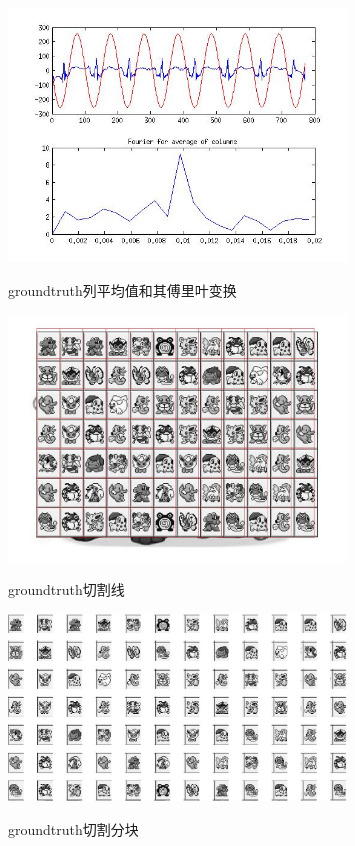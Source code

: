 \documentclass{ctexart}
\begin{document}
\begin{figure}
    \centering
    \includegraphics[width=0.8\textwidth]{process/a421b.jpg}\\
    \caption{groundtruth列平均值和其傅里叶变换\label{a421b}}
\end{figure}
\begin{figure}
    \centering
    \includegraphics[width=0.8\textwidth]{process/a421c.jpg}\\
    \caption{groundtruth切割线\label{a421c}}
\end{figure}
\begin{figure}
    \centering
    \includegraphics[width=0.8\textwidth]{process/a421d.jpg}\\
    \caption{groundtruth切割分块\label{a421d}}
\end{figure}
\end{document}
